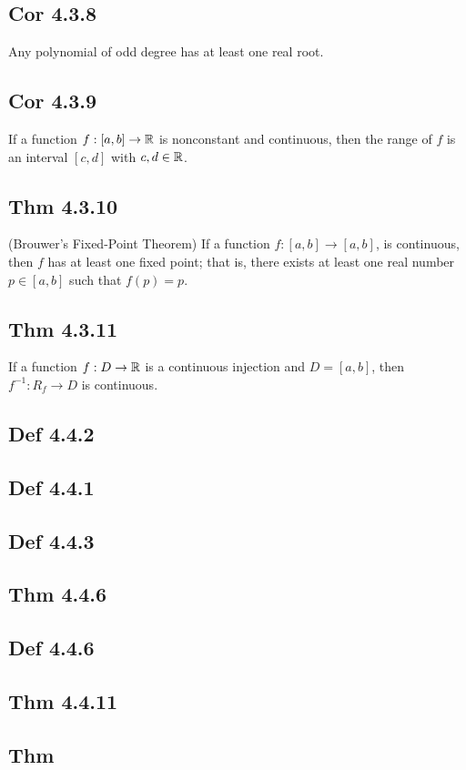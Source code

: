 \subsection*{Cor 4.3.8}
Any polynomial of odd degree has at least one real root.

\subsection*{Cor 4.3.9}
If a function $f : [a, b] \to \mathbb{R}$ is nonconstant and continuous, then the range of $f$ is an interval $[c, d]$ with $c, d \in \mathbb{R}$.

\subsection*{Thm 4.3.10}
    (Brouwer's Fixed-Point Theorem) If a function $f : [a, b] \to [a, b]$, is continuous, then $f$ has at least one fixed point; that is, there exists at least one real number $p \in [a, b]$ such that $f (p) = p$.

\subsection*{Thm 4.3.11}
    If a function $f : D \to \mathbb{R}$ is a continuous injection and $D = [a, b]$, then $f^{-1} : R_f \to D$ is continuous.

\subsection*{Def 4.4.2}

\subsection*{Def 4.4.1}

\subsection*{Def 4.4.3}

\subsection*{Thm 4.4.6}

\subsection*{Def 4.4.6}

\subsection*{Thm 4.4.11}

\subsection*{Thm}


